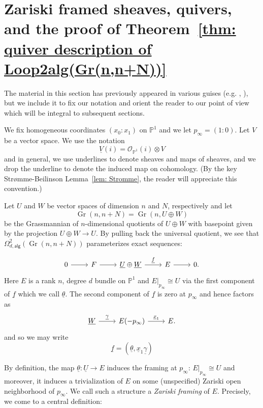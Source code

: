 \documentclass{amsart}
\theoremstyle{definition}
\newcommand{\PP}{\mathbb{P}}
\newcommand{\OO}{\mathcal{O}}
\newcommand{\UL}[1]{\underline{#1}}
\newcommand{\alg}{\mathsf{alg}}
\newcommand{\Gr}{\operatorname{Gr}}
\newcommand{\LoopTwo}{\Omega^{2}_{d,\alg}}
\begin{document}
\section{Zariski framed sheaves, quivers, and the proof of
Theorem~\ref{thm: quiver description of
Loop2alg(Gr(n,n+N))}}\label{sec: Zariski framed sheaves, quivers, and
proof of Loop2(Gr) theorem}


The material in this section has previously appeared in various guises
(e.g. \cite[\S 5]{Larson-Vakil-BottPeriodicity},
\cite[\S 3]{Nakajima-Handsaw}), but we include it to fix our notation
and orient the reader to our point of view which will be integral to
subsequent sections.



We fix homogeneous coordinates $(x_{0}:x_{1})$ on $\PP^{1}$ and we let
$p_{\infty }=(1:0)$. Let $V$ be a vector space. We use the notation
\[
\UL{V}(i) = \OO_{\PP^{1}}(i)\otimes V
\]
and in general, we use underlines to denote sheaves and maps of
sheaves, and we drop the underline to denote the induced map on cohomology.
(By the key Str\o mme-Beilinson Lemma~\ref{lem: Stromme}, the reader will appreciate this convention.)


Let $U$ and $W$ be vector spaces of dimension $n$ and $N$, respectively
and let
\[
\Gr (n,n+N) = \Gr (n,U\oplus W)
\]
be the Grassmannian of $n$-dimensional quotients of $U\oplus W$ with
basepoint given by the projection $U\oplus W\to U$. By pulling back
the universal quotient, we see that $\LoopTwo (\Gr (n,n+N))$
parameterizes exact sequences:

\[
\begin{tikzcd}
0\arrow[r]& F \arrow[r]& \UL{U}\oplus \UL{W} \arrow{r}{\UL{f} } &E
\arrow[r]& 0.
\end{tikzcd}
\]
Here $E$ is a rank $n$, degree $d$ bundle on $\PP^{1}$ and
$E|_{p_{\infty}}\cong U$ via the first component of $\UL{f}$ which we
call $\UL{\theta}$. The second component of $\UL{f}$ is zero at
$p_{\infty}$ and hence factors as
\[
\begin{tikzcd}
 \UL{W} \arrow[r,"\UL{\gamma }"]& E(-p_{\infty})
 \arrow[r,"\UL{x}_{1}"] &E. 
\end{tikzcd}
\]
and so we may write
\[
\UL{f}
=({\UL{\theta}},\UL{x}_{1}\UL{\gamma })
\]

By definition, the map $\UL{\theta}:\UL{U}\to E$ induces the framing
at $p_{\infty}$: $E|_{p_{\infty}}\cong U$ and moreover, it induces a
trivialization of $E$ on some (unspecified) Zariski open neighborhood
of $p_{\infty}$. We call such a structure a \emph{Zariski framing} of $E$.  Precisely, we come to
a central definition:  
\end{document}
